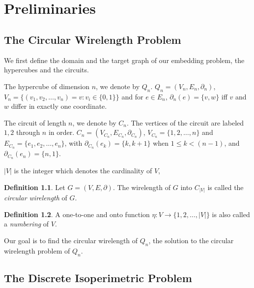 \documentclass[12pt]{ucthesis}
\theoremstyle{plain}
\theoremstyle{definition}
\newtheorem{definition}{Definition}
\begin{document}
\chapter{Preliminaries}
\label{Chapter 2}

\section{The Circular Wirelength Problem}
\label{Section 2.1}

We first define the domain and the target graph of our embedding problem,
the hypercubes and the circuits.

The hypercube of dimension $n$, we denote by $Q_n$.
$Q_n = (V_n, E_n, \partial_n)$,
$V_n = \{(v_1, v_2, \dots, v_n) = v \colon v_i \in \{0, 1\}\}$ and for $e \in E_n$,
$\partial_n(e) = \{v, w\}$ iff $v$ and $w$ differ in exactly one coordinate.

The circuit of length $n$, we denote by $C_n$.
The vertices of the circuit are labeled $1, 2$ through $n$ in order.
$C_n = (V_{C_n}, E_{C_n}, \partial_{C_n})$,
$V_{C_n} = \{1, 2, \dots, n\}$ and $E_{C_n} = \{e_1, e_2, \dots, e_n\}$,
with $\partial_{C_n}(e_k) = \{k, k + 1\}$ when $1 \le k < (n - 1)$,
and $\partial_{C_n}(e_n) = \{n, 1\}$.

$|V|$ is the integer which denotes the cardinality of $V$,
\begin{definition}
\label{Definition 4}
Let $G = (V, E, \partial)$.
The wirelength of $G$ into $C_{|V|}$ is called the \emph{circular wirelength} of $G$.
\end{definition}
\begin{definition}
\label{Definition 5}
A one-to-one and onto function $\eta \colon V \rightarrow \{1, 2, \dots, |V|\}$
is also called a \emph{numbering} of $V$.
\end{definition}

Our goal is to find the circular wirelength of $Q_n$,
the solution to the circular wirelength problem of $Q_n$.

\section{The Discrete Isoperimetric Problem}
\label{Section 2.2}
\end{document}
